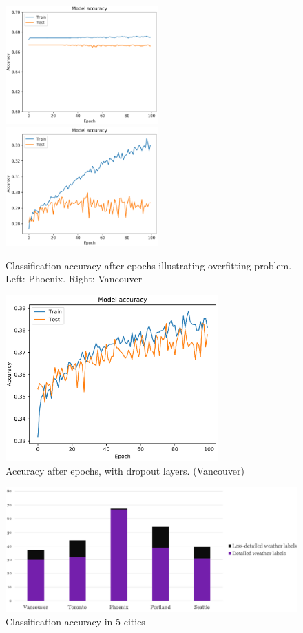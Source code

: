 \documentclass[runningheads]{llncs}
\begin{document}
\begin{figure}
    \centering
    \includegraphics[width=2.3in]{phoenix-overfitting.eps}
    \includegraphics[width=2.3in]{vancouver-overfitting.eps}
    \caption{Classification accuracy after epochs illustrating overfitting problem. Left: Phoenix. Right: Vancouver}\label{overfit}
\end{figure}

\begin{figure}
    \centering
    \includegraphics[height=2.5in]{vancouver-final.eps}
    \caption{Accuracy after epochs, with dropout layers. (Vancouver)}\label{van-final}
\end{figure}


\begin{figure}
    \centering
    \includegraphics[width=\textwidth]{cities.png}
    \caption{Classification accuracy in 5 cities}\label{cities}
\end{figure}
\end{document}
